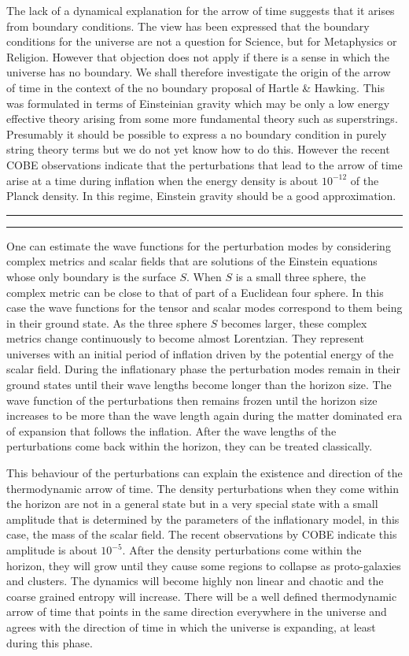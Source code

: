 \begin{enumerate}
The lack of a dynamical explanation for the arrow of time suggests that it arises from boundary conditions. The view has been expressed that the boundary conditions for the universe are not a question for Science, but for Metaphysics or Religion. However that objection does not apply if there is a sense in which the universe has no boundary. We shall therefore investigate the origin of the arrow of time in the context of the no boundary proposal of Hartle & Hawking. This was formulated in terms of Einsteinian gravity which may be only a low energy effective theory arising from some more fundamental theory such as superstrings. Presumably it should be possible to express a no boundary condition in purely string theory terms but we do not yet know how to do this. However the recent COBE observations indicate that the perturbations that lead to the arrow of time arise at a time during inflation when the energy density is about $10^{-12}$ of the Planck density. In this regime, Einstein gravity should be a good approximation.
\bigskip
\hrule
{}
\bigskip
\hrule
\bigskip
One can estimate the wave functions for the perturbation modes by considering complex metrics and scalar fields that are solutions of the Einstein equations whose only boundary is the surface $S$. When $S$ is a small three sphere, the complex metric can be close to that of part of a Euclidean four sphere. In this case the wave functions for the tensor and scalar modes correspond to them being in their ground state. As the three sphere $S$ becomes larger, these complex metrics change continuously to become almost Lorentzian. They represent universes with an initial period of inflation driven by the potential energy of the scalar field. During the inflationary phase the perturbation modes remain in their ground states until their wave lengths become longer than the horizon size. The wave function of the perturbations then remains frozen until the horizon size increases to be more than the wave length again during the matter dominated era of expansion that follows the inflation. After the wave lengths of the perturbations come back within the horizon, they can be treated classically.

This behaviour of the perturbations can explain the existence and direction of the thermodynamic arrow of time. The density perturbations when they come within the horizon are not in a general state but in a very special state with a small amplitude that is determined by the parameters of the inflationary model, in this case, the mass of the scalar field. The recent observations by COBE indicate this amplitude is about $10^{-5}$. After the density perturbations come within the horizon, they will grow until they cause some regions to collapse as proto-galaxies and clusters. The dynamics will become highly non linear and chaotic and the coarse grained entropy will increase. There will be a well defined thermodynamic arrow of time that points in the same direction everywhere in the universe and agrees with the direction of time in which the universe is expanding, at least during this phase.


\end{enumerate}
